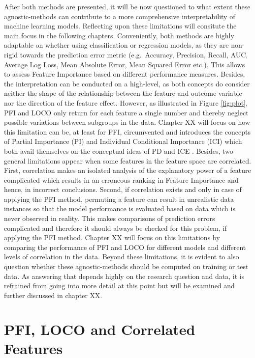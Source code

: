 \documentclass[
]{krantz}
\begin{document}
After both methods are presented, it will be now questioned to what extent these agnostic-methods can contribute to a more comprehensive interpretability of machine learning models. Reflecting upon these limitations will consitute the main focus in the following chapters. Conveniently, both methods are highly adaptable on whether using classification or regression models, as they are non-rigid towards the prediction error metric (e.g.~Accuracy, Precision, Recall, AUC, Average Log Loss, Mean Absolute Error, Mean Squared Error etc.). This allows to assess Feature Importance based on different performance measures. Besides, the interpretation can be conducted on a high-level, as both concepts do consider neither the shape of the relationship between the feature and outcome variable nor the direction of the feature effect. However, as illustrated in Figure \ref{fig:plot}, PFI and LOCO only return for each feature a single number and thereby neglect possible variations between subgroups in the data. Chapter XX will focus on how this limitation can be, at least for PFI, circumvented and introduces the concepts of Partial Importance (PI) and Individual Conditional Importance (ICI) which both avail themselves on the conceptual ideas of PD and ICE \citep[see][]{casalicchio2018visualizing}. Besides, two general limitations appear when some features in the feature space are correlated. First, correlation makes an isolated analysis of the explanatory power of a feature complicated which results in an erroneous ranking in Feature Importance and hence, in incorrect conclusions. Second, if correlation exists and only in case of applying the PFI method, permuting a feature can result in unrealistic data instances so that the model performance is evaluated based on data which is never observed in reality. This makes comparisons of prediction errors complicated and therefore it should always be checked for this problem, if applying the PFI method. Chapter XX will focus on this limitations by comparing the performance of PFI and LOCO for different models and different levels of correlation in the data. Beyond these limitations, it is evident to also question whether these agnostic-methods should be computed on training or test data. As answering that depends highly on the research question and data, it is refrained from going into more detail at this point but will be examined and further discussed in chapter XX.

\hypertarget{pfi-loco-and-correlated-features}{%
\chapter{PFI, LOCO and Correlated Features}\label{pfi-loco-and-correlated-features}}
\end{document}
